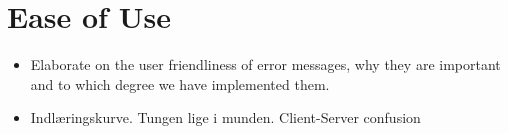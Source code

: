 \section{Ease of Use} %
\label{sec:ease_of_use}

	\begin{itemize}
		\item Elaborate on the user friendliness of error messages, why they are important
		and to which degree we have implemented them.
		\item Indlæringskurve. Tungen lige i munden. Client-Server confusion
	\end{itemize}
